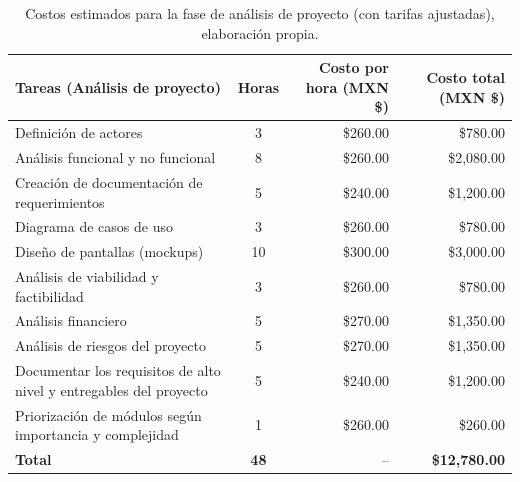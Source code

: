\begin{table}[H]
	\centering
	\renewcommand{\arraystretch}{1.6}
	\setlength{\tabcolsep}{10pt}
	\Huge
	\begin{adjustbox}{max width=\textwidth}
		\begin{tabular}{|p{9.5cm}|c|r|r|}
			\hline
			\textbf{Tareas (Análisis de proyecto)} & \textbf{Horas} & \textbf{Costo por hora (MXN \$)} & \textbf{Costo total (MXN \$)} \\ \hline
			Definición de actores & 3 & \$260.00 & \$780.00 \\ \hline
			Análisis funcional y no funcional & 8 & \$260.00 & \$2,080.00 \\ \hline
			Creación de documentación de requerimientos & 5 & \$240.00 & \$1,200.00 \\ \hline
			Diagrama de casos de uso & 3 & \$260.00 & \$780.00 \\ \hline
			Diseño de pantallas (mockups) & 10 & \$300.00 & \$3,000.00 \\ \hline
			Análisis de viabilidad y factibilidad & 3 & \$260.00 & \$780.00 \\ \hline
			Análisis financiero & 5 & \$270.00 & \$1,350.00 \\ \hline
			Análisis de riesgos del proyecto & 5 & \$270.00 & \$1,350.00 \\ \hline
			Documentar los requisitos de alto nivel y entregables del proyecto & 5 & \$240.00 & \$1,200.00 \\ \hline
			Priorización de módulos según importancia y complejidad & 1 & \$260.00 & \$260.00 \\ \hline
			\textbf{Total} & \textbf{48} & -- & \textbf{\$12,780.00} \\ \hline
		\end{tabular}
	\end{adjustbox}
	\caption[Costos estimados para la fase de análisis de proyecto (con tarifas ajustadas)]{Costos estimados para la fase de análisis de proyecto (con tarifas ajustadas), elaboración propia.} 	
	\label{tab:costos_analisis_actualizado}
\end{table}

